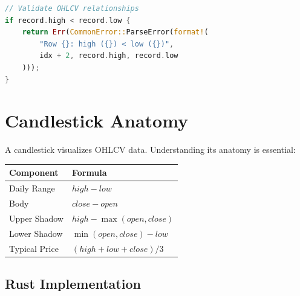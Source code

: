 \begin{lstlisting}[language=Rust]
// Validate OHLCV relationships
if record.high < record.low {
    return Err(CommonError::ParseError(format!(
        "Row {}: high ({}) < low ({})",
        idx + 2, record.high, record.low
    )));
}
\end{lstlisting}

\section{Candlestick Anatomy}


A candlestick visualizes OHLCV data. Understanding its anatomy is essential:


\begin{center}
\begin{tabular}{ll}
\toprule
\textbf{Component} & \textbf{Formula} \\
\midrule
Daily Range & $high - low$ \\
Body & $close - open$ \\
Upper Shadow & $high - \max(open, close)$ \\
Lower Shadow & $\min(open, close) - low$ \\
Typical Price & $(high + low + close) / 3$ \\
\bottomrule
\end{tabular}
\end{center}

\subsection{Rust Implementation}

